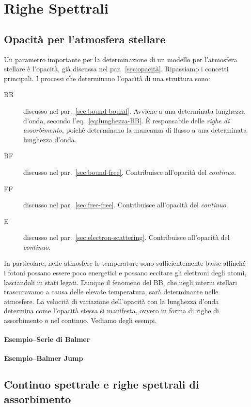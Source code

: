 \section{Righe Spettrali}\label{sec:righe-spettrali}

\subsection{Opacità per l'atmosfera stellare}\label{sec:opacita-atmosfera}
Un parametro importante per la determinazione di un modello per l'atmosfera stellare è l'opacità, già discussa nel par.~\ref{sec:opacità}. Ripassiamo i concetti principali. I processi che determinano l'opacità di una struttura sono:
\begin{description}
    \item[BB] discusso nel par.~\ref{sec:bound-bound}. Avviene a una determinata lunghezza d'onda, secondo l'eq.~\eqref{eq:lunghezza-BB}. È responsabile delle \emph{righe di assorbimento}, poiché determinano la mancanza di flusso a una determinata lunghezza d'onda.
    \item[BF] discusso nel par.~\ref{sec:bound-free}. Contribuisce all'opacità del \emph{continuo}.
    \item[FF] discusso nel par.~\ref{sec:free-free}. Contribuisce all'opacità del \emph{continuo}.
    \item[E] discusso nel par.~\ref{sec:electron-scattering}. Contribuisce all'opacità del \emph{continuo}.
\end{description}
In particolare, nelle atmosfere le temperature sono sufficientemente basse affinché i fotoni possano essere poco energetici e possano eccitare gli elettroni degli atomi, lasciandoli in stati legati. Dunque il fenomeno del BB, che negli interni stellari trascuravamo a causa delle elevate temperatura, sarà determinante nelle atmosfere. La velocità di variazione dell'opacità con la lunghezza d'onda determina come l'opacità stessa si manifesta, ovvero in forma di righe di assorbimento o nel continuo. Vediamo degli esempi.

\paragraph{Esempio--Serie di Balmer}
\paragraph{Esempio--Balmer Jump}

\subsection{Continuo spettrale e righe spettrali di assorbimento}

